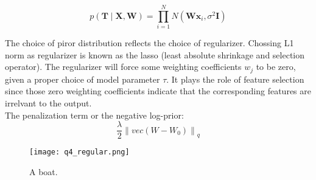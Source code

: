 \documentclass[12pt]{article}
\newenvironment{question}[2][Question]{\begin{trivlist}
\kern10pt
\item[\hskip \labelsep {\bfseries #1}\hskip \labelsep {\bfseries #2.}]}{\end{trivlist}}
\begin{document}
\begin{question}{3}

\begin{equation}
  p(\textbf{T}\mid \textbf{X},\textbf{W}) =
  \prod _{i=1}^{N}N(\textbf{W}\textbf{x}_i, \sigma^2\textbf{I})
\end{equation}
\end{question} %
\begin{question}{4}
The choice of piror distribution reflects the choice of regularizer. Chossing L1 
norm as regularizer is known as the lasso (least absolute shrinkage and selection operator).
The regularizer will force some weighting coefficients $w_j$ to be zero, given 
a proper choice of model parameter $\tau$. It plays the role of feature selection
since those zero weighting coefficients indicate that the corresponding features
are irrelvant to the output. \\ 

The penalization term or the negative log-prior:
\begin{equation}
  \frac{\lambda}{2} \left \|vec(W - W_0)\right \|_{q}  %
\end{equation}

\begin{figure}[h!]
  \centering
  \texttt{[image: q4\_regular.png]}
  \caption{A boat.}
  \label{fig:boat1}
\end{figure}
\end{question} %





 
\end{document}
